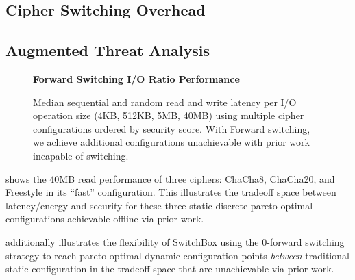 
\subsection{Cipher Switching Overhead}


\subsection{Augmented Threat Analysis}


\begin{figure*}[ht]
   \textbf{Forward Switching I/O Ratio Performance}\par\medskip
   \centering
   {} \caption{Median sequential and
   random read and write latency per I/O operation size (4KB, 512KB, 5MB, 40MB)
   using multiple cipher configurations ordered by security score. With Forward
   switching, we achieve additional configurations unachievable with prior work
   incapable of switching.}
  \label{fig:tradeoff-with-ratios}
\end{figure*}


 shows the 40MB read performance of three ciphers:
ChaCha8, ChaCha20, and Freestyle in its ``fast'' configuration. This illustrates
the tradeoff space between latency/energy and security for these three static
discrete pareto optimal configurations achievable offline via prior work.

 additionally illustrates the flexibility of
SwitchBox using the 0-forward switching strategy to reach pareto optimal dynamic
configuration points \emph{between} traditional static configuration in the
tradeoff space that are unachievable via prior work.

